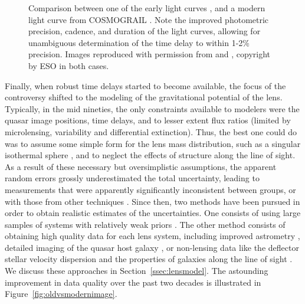 \begin{figure}
\begin{minipage}{0.48\linewidth}
\end{minipage}
\caption{Comparison between one of the early light curves \citep[left
panel, from][]{Van89}, and a modern light curve from COSMOGRAIL
\citep[right panel, from][]{Tew++13}. Note the improved photometric
precision, cadence, and duration of the light curves, allowing for
unambiguous determination of the time delay to within 1-2\% precision.
Images reproduced with permission from \citet{Van89} and \citep{Tew++13},
copyright by ESO in both cases.}
\label{fig:oldvsmoderndt}
\end{figure}

Finally, when robust time delays started to become available, the
focus of the controversy shifted to the modeling of the gravitational
potential of the lens. Typically, in the mid nineties, the only
constraints available to modelers were the quasar image positions,
time delays, and to lesser extent flux ratios (limited by
microlensing, variability and differential extinction). Thus, the best
one could do was to assume some simple form for the lens mass
distribution, such as a singular isothermal sphere \citep{K+F99},
and to neglect the
effects of structure along the line of sight. As a result of these necessary
but oversimplistic assumptions, the apparent random errors grossly underestimated
the total uncertainty, leading to measurements that were apparently
significantly inconsistent
between groups, or with those from other techniques
\citep{K+S04}. Since then, two methods have been pursued in order to
obtain realistic estimates of the uncertainties. One consists of using
large samples of systems with relatively weak priors
\citep{Ogu07b}. The other method consists of obtaining high quality data for
each lens system, including improved astrometry \citep{Cou++97}, detailed imaging of
the quasar host galaxy
\citep{Keeton:2000p241,KKM01,Koo++03,WBB04,Suy++06}, or non-lensing data like the deflector
stellar velocity dispersion \citep{T+K02b} and the properties of
galaxies along the line of sight \citep{K+Z04,Suy++10}. We discuss
these approaches in Section~\ref{ssec:lensmodel}. The astounding
improvement in data quality over the past two decades is illustrated
in Figure~\ref{fig:oldvsmodernimage}.

